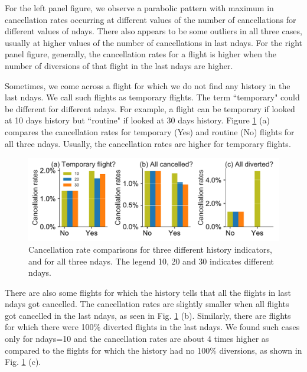 \documentclass[12pt]{article}
\begin{document}
For the left panel figure, we observe a parabolic pattern with maximum in cancellation rates occurring at different values of the number of cancellations for different values of ndays. There also appears to be some outliers in all three cases, usually at higher values of the number of cancellations in last ndays.
For the right panel figure, generally, the cancellation rates for a flight is higher when the number of diversions of that flight in the last ndays are higher.


Sometimes, we come across a flight for which we do not find any history in the last ndays. We call such flights as temporary flights. The term ``temporary" could be different for different ndays. For example, a flight can be temporary if looked at 10 days history but ``routine" if looked at 30 days history. Figure \ref{fig:historyindicatorcanrate} (a) compares the cancellation rates for temporary (Yes) and routine (No) flights  for all three ndays. Usually, the cancellation rates are higher for temporary flights.  
\begin{figure}[h!]
\begin{center}
\includegraphics[width=6in]{history_indicator_canrate.pdf}
\end{center}
\caption{\label{fig:historyindicatorcanrate}
Cancellation rate comparisons for three different history indicators, and for all three ndays. The legend 10, 20 and 30 indicates different ndays.}
\end{figure}
There are also some flights for which the history tells that all the flights in last ndays got cancelled. The cancellation rates are slightly smaller when all flights got cancelled in the last ndays, as seen in Fig. \ref{fig:historyindicatorcanrate} (b). Similarly, there are flights for which there were 100$\%$ diverted flights in the last ndays. We found such cases only for ndays=10 and the cancellation rates are about 4 times higher as compared to the flights for which the history had no 100$\%$ diversions, as shown in Fig. \ref{fig:historyindicatorcanrate} (c).
\end{document}
